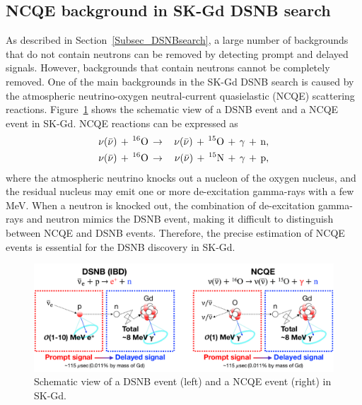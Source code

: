 




\subsection{NCQE background in SK-Gd DSNB search}\label{Subsec_NCQEbackground}
\vs\hs
As described in Section~\ref{Subsec_DSNBsearch}, a large number of backgrounds that do not contain neutrons can be removed by detecting prompt and delayed signals.
However, backgrounds that contain neutrons cannot be completely removed.
One of the main backgrounds in the SK-Gd DSNB search is caused by the atmospheric neutrino-oxygen neutral-current quasielastic (NCQE) scattering reactions.
Figure~\ref{DSNB_NCQE} shows the schematic view of a DSNB event and a NCQE event in SK-Gd.
NCQE reactions can be expressed as
\begin{eqnarray}
	\nu(\bar{\nu})\,+\,^{16}{\rm O}\,&\to&\,\nu(\bar{\nu})\,+\,^{15}{\rm O}\,+\,\gamma\,+\,{\rm n}, \nonumber \\
	\nu(\bar{\nu})\,+\,^{16}{\rm O}\,&\to&\,\nu(\bar{\nu})\,+\,^{15}{\rm N}\,+\,\gamma\,+\,{\rm p},
\end{eqnarray}
where the atmospheric neutrino knocks out a nucleon of the oxygen nucleus, and the residual nucleus may emit one or more de-excitation gamma-rays with a few MeV.
When a neutron is knocked out, the combination of de-excitation gamma-rays and neutron mimics the DSNB event, making it difficult to distinguish between NCQE and DSNB events.
Therefore, the precise estimation of NCQE events is essential for the DSNB discovery in SK-Gd.

\begin{figure}[h]
	\centering
	\includegraphics[width=16cm]{Figures/Introduction/DSNB_NCQE}
	\caption[Schematic view of a DSNB event and a NCQE event in SK-Gd]{
	Schematic view of a DSNB event (left) and a NCQE event (right) in SK-Gd.
	}\label{DSNB_NCQE}
\end{figure}

